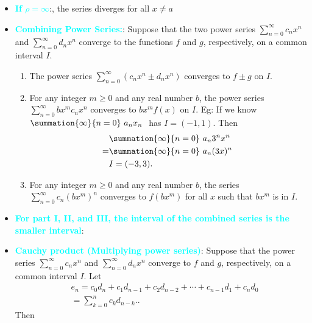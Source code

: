 \documentclass{report}
\begin{document}
\begin{itemize}
        \item \textbf{\textcolor{cyan}{If $\rho = \infty$}}:, the series diverges for all $x \neq a$ 
        \item \textbf{\textcolor{cyan}{Combining Power Series:}}:
            Suppose that the two power series \(\sum_{n=0}^{\infty} c_n x^n\) and \(\sum_{n=0}^{\infty} d_n x^n\) converge to the functions \(f\) and \(g\), respectively, on a common interval \(I\).
            \begin{enumerate}[label=(\roman*)]
                \item The power series \(\sum_{n=0}^{\infty} (c_n x^n \pm d_n x^n)\) converges to \(f \pm g\) on \(I\).
                \item For any integer \(m \geq 0\) and any real number \(b\), the power series \(\sum_{n=0}^{\infty} b x^m c_n x^n\) converges to \(b x^m f(x)\) on \(I\).
                    \smallbreak \noindent
                    Eg: If we know $\summation{\infty}{n=0}\ a_{n}x_{n}\  $ has $I = (-1,1) $. Then
                    \begin{align*}
                            &\summation{\infty}{n=0}\ a_{n}3^{n}x^{n}\  \\
                        =&\summation{\infty}{n=0}\ a_{n}(3x)^{n}\  \\
                         &I=(-3,3)
                     .\end{align*}
                 \item For any integer \(m \geq 0\) and any real number \(b\), the series \(\sum_{n=0}^{\infty} c_n (b x^m)^n\) converges to \(f(b x^m)\) for all \(x\) such that \(b x^m\) is in \(I\).
             \end{enumerate}
         \item \textbf{\textcolor{cyan}{For part I, II, and III, the interval of the combined series is the smaller interval}}:
         \item \textbf{\textcolor{cyan}{Cauchy product (Multiplying power series)}}:
             Suppose that the power series \(\sum_{n=0}^{\infty} c_n x^n\) and \(\sum_{n=0}^{\infty} d_n x^n\) converge to \(f\) and \(g\), respectively, on a common interval \(I\). Let
             \begin{align*}
                    &e_n = c_0 d_n + c_1 d_{n-1} + c_2 d_{n-2} + \cdots + c_{n-1} d_1 + c_n d_0  \\
                    &= \sum_{k=0}^{n} c_k d_{n-k}.
                .\end{align*}
                Then
                \[
\]
\end{itemize}
\end{document}
